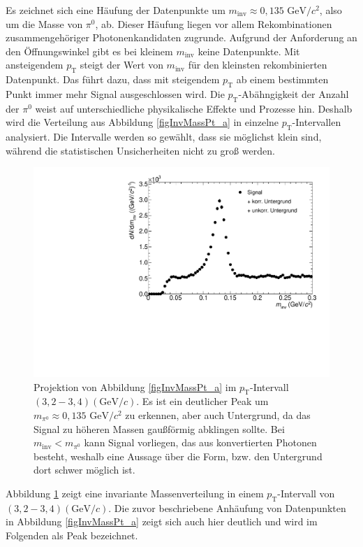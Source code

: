 Es zeichnet sich eine H\"aufung der Datenpunkte um $m_{\text{inv}}\approx 0,135\text{ GeV}/c^{2}$, also um die Masse von $\pi^{0}$, ab.
Dieser H\"aufung liegen vor allem Rekombinationen zusammengeh\"origer Photonenkandidaten zugrunde.
Aufgrund der Anforderung an den \"Offnungswinkel gibt es bei kleinem $m_{\text{inv}}$ keine Datenpunkte.
Mit ansteigendem $p_{\text{T}}$ steigt der Wert von $m_{\text{inv}}$ f\"ur den kleinsten rekombinierten Datenpunkt.
Das f\"uhrt dazu, dass mit steigendem $p_{\text{T}}$ ab einem bestimmten Punkt immer mehr Signal ausgeschlossen wird.
\newline
Die $p_{\text{T}}$-Ab\"ahngigkeit der Anzahl der $\pi^{0}$ weist auf unterschiedliche physikalische Effekte und Prozesse hin.
Deshalb wird die Verteilung aus Abbildung \ref{figInvMassPt_a} in einzelne $p_{\text{T}}$-Intervallen analysiert.
Die Intervalle werden so gew{\"a}hlt, dass sie m{\"o}glichst klein sind, w{\"a}hrend die statistischen Unsicherheiten nicht zu gro{\ss} werden.
\begin{figure}[tbp]
\centering
\includegraphics[width=.75\linewidth]{hSignalPlusBkg.pdf}
\caption{Projektion von Abbildung \ref{figInvMassPt_a} im $p_{\text{T}}$-Intervall $(3,2 - 3,4) (\text{GeV/}c)$. Es ist ein deutlicher Peak um $m_{\pi^{0}} \approx 0,135\text{ GeV/}c^{2}$ zu erkennen, aber auch Untergrund, da das Signal zu h{\"o}heren Massen gau{\ss}f{\"o}rmig abklingen sollte. Bei $m_{\text{inv}} < m_{\pi^{0}}$ kann Signal vorliegen, das aus konvertierten Photonen besteht, weshalb eine Aussage {\"u}ber die Form, bzw. den Untergrund dort schwer m{\"o}glich ist.}
\label{figSignalPlusBkg}
\end{figure}
\newline
Abbildung \ref{figSignalPlusBkg} zeigt eine invariante Massenverteilung in einem $p_{\text{T}}$-Intervall von $(3,2 - 3,4)(\text{GeV}/c)$.
Die zuvor beschriebene Anh\"aufung von Datenpunkten in Abbildung \ref{figInvMassPt_a} zeigt sich auch hier deutlich und wird im Folgenden als Peak bezeichnet.
